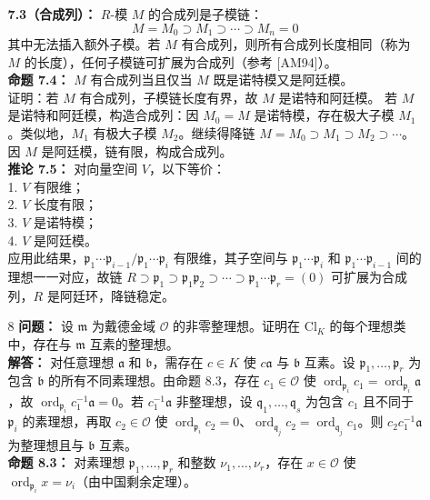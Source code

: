 \documentclass[UTF8]{ctexart}
\begin{document}
\begin{enumerate}
\begin{enumerate}
\textbf{7.3（合成列）：} \(R\)-模 \(M\) 的合成列是子模链：
\[
M = M_0 \supset M_1 \supset \cdots \supset M_n = 0
\]
其中无法插入额外子模。若 \(M\) 有合成列，则所有合成列长度相同（称为 \(M\) 的长度），任何子模链可扩展为合成列（参考 [AM94]）。\\
\textbf{命题 7.4：} \(M\) 有合成列当且仅当 \(M\) 既是诺特模又是阿廷模。\\
证明：若 \(M\) 有合成列，子模链长度有界，故 \(M\) 是诺特和阿廷模。  
若 \(M\) 是诺特和阿廷模，构造合成列：因 \(M_0 = M\) 是诺特模，存在极大子模 \(M_1\)。类似地，\(M_1\) 有极大子模 \(M_2\)。继续得降链 \(M = M_0 \supset M_1 \supset M_2 \supset \cdots\)。因 \(M\) 是阿廷模，链有限，构成合成列。\\
\textbf{推论 7.5：} 对向量空间 \(V\)，以下等价：\\
1. \(V\) 有限维；\\
2. \(V\) 长度有限；\\
3. \(V\) 是诺特模；\\
4. \(V\) 是阿廷模。\\
应用此结果，\(\mathfrak{p}_1 \cdots \mathfrak{p}_{i-1} / \mathfrak{p}_1 \cdots \mathfrak{p}_i\) 有限维，其子空间与 \(\mathfrak{p}_1 \cdots \mathfrak{p}_i\) 和 \(\mathfrak{p}_1 \cdots \mathfrak{p}_{i-1}\) 间的理想一一对应，故链 \(R \supset \mathfrak{p}_1 \supset \mathfrak{p}_1 \mathfrak{p}_2 \supset \cdots \supset \mathfrak{p}_1 \cdots \mathfrak{p}_r = (0)\) 可扩展为合成列，\(R\) 是阿廷环，降链稳定。


\item[8]
\textbf{问题：} 设 \(\mathfrak{m}\) 为戴德金域 \(\mathcal{O}\) 的非零整理想。证明在 \(\mathrm{Cl}_K\) 的每个理想类中，存在与 \(\mathfrak{m}\) 互素的整理想。\\
\textbf{解答：} 对任意理想 \(\mathfrak{a}\) 和 \(\mathfrak{b}\)，需存在 \(c \in K\) 使 \(c \mathfrak{a}\) 与 \(\mathfrak{b}\) 互素。设 \(\mathfrak{p}_1, \dots, \mathfrak{p}_r\) 为包含 \(\mathfrak{b}\) 的所有不同素理想。由命题 8.3，存在 \(c_1 \in \mathcal{O}\) 使 \(\operatorname{ord}_{\mathfrak{p}_i} c_1 = \operatorname{ord}_{\mathfrak{p}_i} \mathfrak{a}\)，故 \(\operatorname{ord}_{\mathfrak{p}_i} c_1^{-1} \mathfrak{a} = 0\)。若 \(c_1^{-1} \mathfrak{a}\) 非整理想，设 \(\mathfrak{q}_1, \dots, \mathfrak{q}_s\) 为包含 \(c_1\) 且不同于 \(\mathfrak{p}_i\) 的素理想，再取 \(c_2 \in \mathcal{O}\) 使 \(\operatorname{ord}_{\mathfrak{p}_i} c_2 = 0\)、\(\operatorname{ord}_{\mathfrak{q}_j} c_2 = \operatorname{ord}_{\mathfrak{q}_j} c_1\)。则 \(c_2 c_1^{-1} \mathfrak{a}\) 为整理想且与 \(\mathfrak{b}\) 互素。\\
\textbf{命题 8.3：} 对素理想 \(\mathfrak{p}_1, \dots, \mathfrak{p}_r\) 和整数 \(\nu_1, \dots, \nu_r\)，存在 \(x \in \mathcal{O}\) 使 \(\operatorname{ord}_{\mathfrak{p}_i} x = \nu_i\)（由中国剩余定理）。


\end{enumerate}
\end{enumerate}
\end{document}
